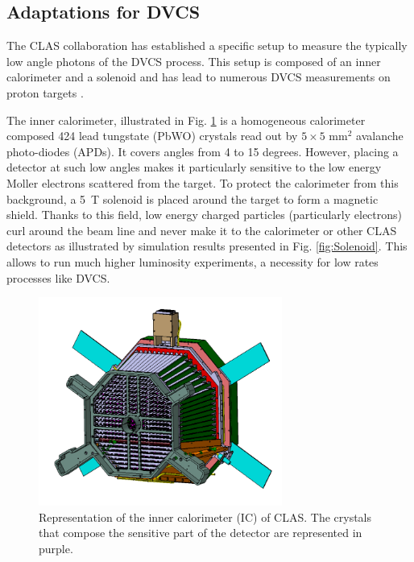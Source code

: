 \documentclass[aps,prc,preprint,superscriptaddress]{revtex4}
\begin{document}
\subsection{Adaptations for DVCS}

The CLAS collaboration has established a specific setup to measure the typically 
low angle photons of the DVCS process. This setup is composed of an inner 
calorimeter and a solenoid and has lead to numerous DVCS measurements on proton 
targets \cite{Seder:2014cdc,Jo:2015ema,HirlingerSaylor:2018bnu}.

The inner calorimeter, illustrated in Fig. \ref{fig:IC} is a homogeneous 
calorimeter composed 424 lead tungstate 
(PbWO) crystals read out by $5 \times 5$ mm$^2$ avalanche photo-diodes (APDs). 
It covers angles from 4 to 15 degrees. However, placing a detector at such low angles makes it 
particularly sensitive to the low energy Moller electrons scattered from the target.
To protect the calorimeter from this background, a 5~T solenoid is 
placed around the target to form
a magnetic shield. Thanks to this field, low energy charged particles (particularly 
electrons) curl around the beam line 
and never make it to the calorimeter or other CLAS detectors as illustrated 
by simulation results presented 
in Fig. \ref{fig:Solenoid}. This allows to run much higher luminosity experiments,
a necessity for low rates processes like DVCS.

\begin{figure}[tbp!]
\center
\includegraphics[width=8cm]{fig3/IC-CLAS.png}
	\caption{Representation of the inner calorimeter (IC) of CLAS. The crystals that compose the
	sensitive part of the detector are represented in purple.}
\label{fig:IC}
\end{figure}
\end{document}
